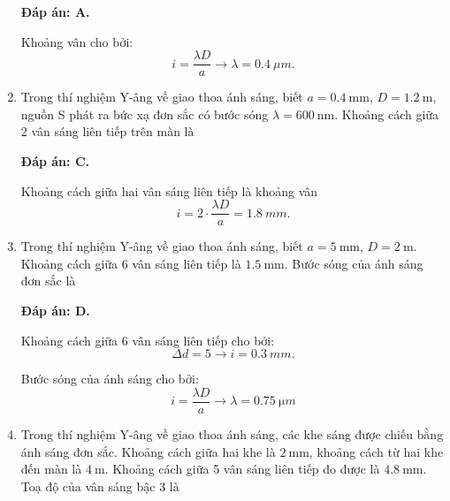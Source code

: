 \begin{enumerate}[label=\bfseries Câu \arabic*:]
	\loigiai
	{		\textbf{Đáp án: A.}
		
Khoảng vân cho bởi:
$$
	i = \dfrac{\lambda D}{a} \rightarrow \lambda = \SI{0,4}{\mu m}.
$$	
	}
	
	\item {}
		\cauhoi
	{Trong thí nghiệm Y-âng về giao thoa ánh sáng, biết $a=\SI{0.4}{\milli \meter}$, $D=\SI{1.2}{\meter}$, nguồn S phát ra bức xạ đơn sắc có bước sóng $\lambda = \SI{600}{\nano \meter}$. Khoảng cách giữa 2 vân sáng liên tiếp trên màn là
	}
	
	\loigiai
	{		\textbf{Đáp án: C.}
		
Khoảng cách giữa hai vân sáng liên tiếp là khoảng vân
$$
	i = 2 \cdot \dfrac{\lambda D}{a} = \SI{1,8}{mm}.
$$
		
	}
	
\item {} 
		\cauhoi
	{Trong thí nghiệm Y-âng về giao thoa ánh sáng, biết $a=\SI{5}{\milli \meter}$, $D=\SI{2}{\meter}$. Khoảng cách giữa 6 vân sáng liên tiếp là $\SI{1.5}{\milli \meter}$. Bước sóng của ánh sáng đơn sắc là
	}
	
	\loigiai
	{		\textbf{Đáp án: D.}
	
Khoảng cách giữa 6 vân sáng liên tiếp cho bởi:
$$
	\Delta d = 5 \rightarrow i = \SI{0,3}{mm}.
$$
		
Bước sóng của ánh sáng cho bởi:
$$
	i = \dfrac{\lambda D}{a} \rightarrow \lambda = \SI{0,75}{\micro m}
$$
		
	}
	
\item {} 
		\cauhoi
	{Trong thí nghiệm Y-âng về giao thoa ánh sáng, các khe sáng được chiếu bằng ánh sáng đơn sắc. Khoảng cách giữa hai khe là $\SI{2}{\milli \meter}$, khoảng cách từ hai khe đến màn là $\SI{4}{\meter}$. Khoảng cách giữa 5 vân sáng liên tiếp đo được là $\SI{4.8}{\milli \meter}$. Toạ độ của vân sáng bậc 3 là
	}
	

\end{enumerate}
